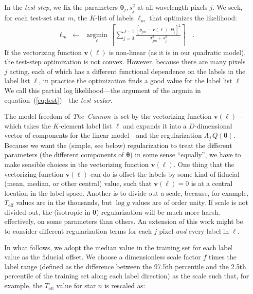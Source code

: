 \documentclass[12pt,preprint]{aastex}
\newcommand{\project}[1]{\textsl{#1}}
\newcommand{\TheCannon}{\project{The~Cannon}}
\newcommand{\logg}{\log g}
\newcommand{\Teff}{T_{\mathrm{eff}}}
\newcommand{\Dvector}[1]{\boldsymbol{#1}}
\newcommand{\vectheta}{\Dvector{\theta}}
\newcommand{\vecv}{\Dvector{v}}
\newcommand{\argmin}[1]{\underset{#1}{\operatorname{argmin}}\,}
\begin{document}
In the \emph{test step}, we fix the parameters $\vectheta_j,s^2_j$ at all
wavelength pixels $j$.  We seek, for each test-set star $m$, the $K$-list of 
labels $\ell_m$ that optimizes the likelihood:
\begin{eqnarray}\label{eq:test}
  \ell_m &\leftarrow& \argmin{\ell}\left[
    \sum_{j=0}^{J-1} \frac{[y_{jm}-\vecv(\ell)\cdot\vectheta_j]^2}{\sigma^2_{jm}+s^2_j}
    \right]
  \quad .
\end{eqnarray}
If the vectorizing function $\vecv(\ell)$ is non-linear (as it is in our 
quadratic model), the test-step optimization is not convex.  However, because
there are many pixels $j$ acting, each of which has a different functional
dependence on the labels in the label list $\ell$, in practice the optimization 
finds a good value for the label list $\ell$.  We call
this partial log likelihood---the argument of the argmin in 
equation~(\ref{eq:test})---the \emph{test scalar}.


The model freedom of \TheCannon\ is set by the vectorizing function 
$\vecv(\ell)$---which takes the $K$-element label list $\ell$ and expands it 
into a $D$-dimensional vector of components for the linear model---and the 
regularization $\Lambda_j\,Q(\vectheta)$.  Because we want the (simple, see 
below) regularization to treat the different parameters (the different 
components of $\vectheta$) in some sense ``equally'', we have to make sensible 
choices in the vectorizing function $\vecv(\ell)$.  One thing that the 
vectorizing function $\vecv(\ell)$ can do is offset the labels by some kind of
fiducial (mean, median, or other central) value, such that $\vecv(\ell)=0$ is at
a central location in the label space.  Another is to divide out a scale, 
because, for example, $\Teff$ values are in the thousands, but $\logg$ values
are of order unity.  If scale is not divided out, the (isotropic in $\vectheta$)
regularization will be much more harsh, effectively, on some parameters than 
others.  An extension of this work might be to consider different regularization
terms for each $j$ pixel \emph{and} every label in $\ell$.


In what follows, we adopt the median value in the training set for each label 
value as the fiducial offset.  We choose a dimensionless scale factor $f$ 
times the label range (defined as the difference between the 97.5th percentile
and the 2.5th percentile of the training set along each label direction) as 
the scale such that, for example, the $\Teff$ value for star $n$ is rescaled as:
\end{document}
